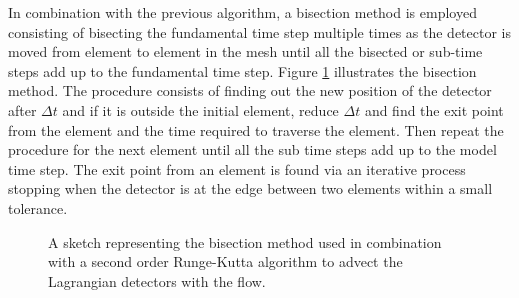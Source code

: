 In combination with the previous algorithm, a bisection method is employed consisting of bisecting the fundamental time step multiple times as the detector is moved from element to element in the mesh until all the bisected or sub-time steps add up to the fundamental time step. Figure \ref{fig:bisection_menthod} illustrates the bisection method. The procedure consists of finding out the new position of the detector after $\Delta t$ and if it is outside the initial element, reduce $\Delta t$ and find the exit point from the element and the time required to traverse the element. Then repeat the procedure for the next element until all the sub time steps add up to the model time step. The exit point from an element is found via an iterative process stopping when the detector is at the edge between two elements within a small tolerance.
% 
\begin{figure}[ht]
  \centering
  \caption{A sketch representing the bisection method used in combination with a second order Runge-Kutta algorithm to advect the Lagrangian detectors with the flow.}
  \label{fig:bisection_menthod}
\end{figure}


